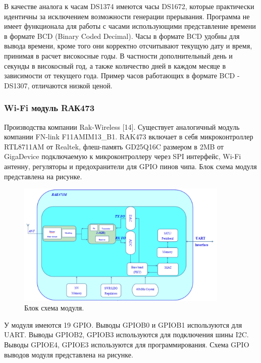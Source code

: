 В качестве аналога к часам DS1374 имеются часы DS1672, которые практически идентичны за исключением возможности генерации прерывания. 
Программа не имеет функционала для работы с часами использующими представление времени в формате BCD (Binary Coded Decimal). Часы в формате BCD удобны для вывода времени, кроме того они корректно отсчитывают текущую дату и время, принимая в расчет високосные годы. В частности дополнительный день и секунды в високосный год, а также количество дней в каждом месяце в зависимости от текущего года. 
Пример часов работающих в формате BCD - DS1307, отличаются низкой ценой.


\subsubsection{ Wi-Fi модуль RАК473 }
Производства компании Rak-Wireless [14]. 
Существует аналогичный модуль компании FN-link F11AMIM13\_B1. RAK473 включает в себя микроконтроллер RTL8711AM от Realtek, флеш-память GD25Q16C размером в 2MB от GigaDevice подключаемую к микроконтроллеру через SPI интерфейс, Wi-Fi антенну, регуляторы и предохранители для GPIO пинов чипа. Блок схема модуля представлена на рисунке.

\begin{figure}[h!]
    \centering
    \includegraphics[width=0.9\textwidth]{rak473_block_diagram.png}
    \caption{Блок схема модуля.}
\end{figure}

У модуля имеются 19 GPIO. 
Выводы GPIOB0 и GPIOB1 используются для UART.
Выводы GPIOB2, GPIOB3 используются для подключения шины I2C.
Выводы GPIOE4, GPIOE3 используются для программирования.
Схема GPIO выводов модуля представлена на рисунке.

